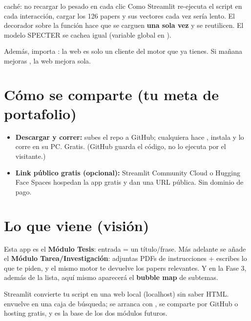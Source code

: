 \documentclass[11pt,a4paper]{article}
\begin{document}
\begin{concepto}{caché: no recargar lo pesado en cada clic}
Como Streamlit re-ejecuta el script en cada interacción, cargar los 126 papers y sus vectores
cada vez sería lento. El decorador  sobre la función
 hace que se carguen \textbf{una sola vez} y se reutilicen. El modelo
SPECTER se cachea igual (variable global en ).
\end{concepto}

Además,  importa : la web es solo un
cliente del motor que ya tienes. Si mañana mejoras , la web mejora sola.

\section{Cómo se comparte (tu meta de portafolio)}

\begin{itemize}
  \item \textbf{Descargar y correr:} subes el repo a GitHub; cualquiera hace ,
        instala  y lo corre en su PC. Gratis. (GitHub guarda el código,
        no lo ejecuta por el visitante.)
  \item \textbf{Link público gratis (opcional):} Streamlit Community Cloud o Hugging Face Spaces
        hospedan la app gratis y dan una URL pública. Sin dominio de pago.
\end{itemize}

\section{Lo que viene (visión)}

Esta app es el \textbf{Módulo Tesis}: entrada = un título/frase. Más adelante se añade el
\textbf{Módulo Tarea/Investigación}: adjuntas PDFs de instrucciones + escribes lo que te piden,
y el mismo motor te devuelve los papers relevantes. Y en la Fase 3, además de la lista, aquí
mismo aparecerá el \textbf{bubble map} de subtemas.

\begin{resumen}
Streamlit convierte tu script en una web local (localhost) sin saber HTML. 
envuelve  en una caja de búsqueda; se arranca con , se comparte por GitHub o hosting gratis, y es la base de los dos módulos futuros.
\end{resumen}
\clearpage
{}
{}
\end{document}
